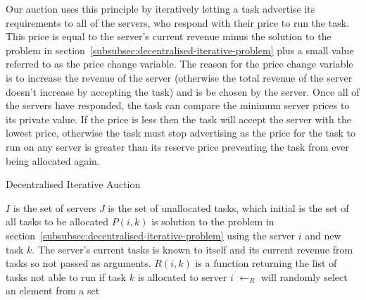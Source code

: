Our auction uses this principle by iteratively letting a task advertise its requirements to all of the servers, who
respond with their price to run the task. This price is equal to the server's current revenue minus the solution to the
problem in section~\ref{subsubsec:decentralised-iterative-problem} plus a small value referred to as the price change
variable. The reason for the price change variable is to increase the revenue of the server (otherwise the total
revenue of the server doesn't increase by accepting the task) and is be chosen by the server. Once all of the servers
have responded, the task can compare the minimum server prices to its private value. If the price is less then the
task will accept the server with the lowest price, otherwise the task must stop advertising as the price for the task
to run on any server is greater than its reserve price preventing the task from ever being allocated again.

\begin{algorithm}[H]
    \caption{Decentralised Iterative Auction}
    \label{alg:dia}
    \begin{algorithmic}
        \REQUIRE $I$ is the set of servers
        \REQUIRE $J$ is the set of unallocated tasks, which initial is the set of all tasks to be allocated
        \REQUIRE $P(i, k)$ is solution to the problem in section~\ref{subsubsec:decentralised-iterative-problem}
        using the server $i$ and new task $k$.
        The server's current tasks is known to itself and its current revenue from tasks so not passed as arguments.
        \REQUIRE $R(i, k)$ is a function returning the list of tasks not able to run if task $k$ is allocated to server $i$
        \REQUIRE $\leftarrow_R$ will randomly select an element from a set
                \ENDFOR
            \ENDIF
        \ENDWHILE
    \end{algorithmic}
\end{algorithm}

